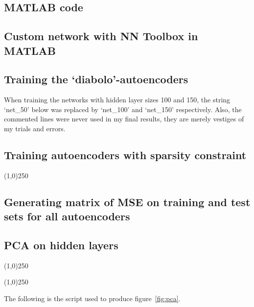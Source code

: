 \documentclass{article}
\begin{document}
\begin{appendices}
\section{MATLAB code}
\subsection{Custom network with NN Toolbox in MATLAB}
\label{app:create}

\subsection{Training the `diabolo'-autoencoders}
{\color{blue}When training the networks with hidden layer sizes 100 and 150, the string `net\_50' below was replaced by
`net\_100' and `net\_150' respectively. Also, the commented lines were never used in my final results, they are merely vestiges of my trials and errors.}
\label{app:train_diabolo}

\subsection{Training autoencoders with sparsity constraint}
\label{app:sparse}

\begin{center}
\line(1,0){250}
\end{center}

\subsection{Generating matrix of MSE on training and test sets for all autoencoders}
\label{app:msemat}

\subsection{PCA on hidden layers}
\label{app:pca}

\begin{center}
\line(1,0){250}
\end{center}

\begin{center}
\line(1,0){250}
\end{center}
{\color{blue}The following is the script used to produce figure~\ref{fig:pca}.}

\end{appendices}
\end{document}
